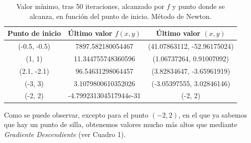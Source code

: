 \documentclass[11pt,a4paper]{article}
\theoremstyle{definition}
\begin{document}
	\begin{table}[htbp]
	\begin{center}
	\begin{tabular}{|c|c|c|}
	\hline
	Punto de inicio & Último valor $f(x,y)$ & Último valor $(x,y)$ \\
	\hline \hline
	(-0.5, -0.5) & 7897.582180054467 & (41.07863112, -52.96175024)\\ \hline
	(1, 1) & 11.344755748360596 & (1.06737264, 0.91007092)\\ \hline
	(2.1, -2.1) & 96.54631298064457 & (3.82834647, -3.65961919)\\  \hline
	(-3, 3) & 3.1079800610352026 & (-3.05397555, 3.02846146)\\ \hline
	(-2, 2) & -4.799231304517944e-31 & (-2, 2)\\ \hline
	\end{tabular}
	\caption{Valor mínimo, tras 50 iteraciones, alcanzado por $f$ y punto donde se alcanza, en función del punto de inicio. Método de Newton.}
	\label{tabla:sencilla}
	\end{center}
	\end{table}
	
	Como se puede observar, excepto para el punto $(-2,2)$, en el que ya sabemos que hay un punto de silla, obtenemos valores mucho más altos que mediante  \textit{Gradiente Descendiente} (ver Cuadro 1). 
	
\end{document}
